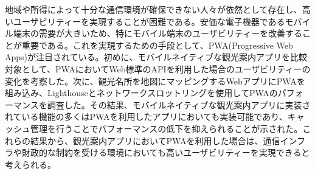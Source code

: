 地域や所得によって十分な通信環境が確保できない人々が依然として存在し、高いユーザビリティーを実現することが困難である。安価な電子機器であるモバイル端末の需要が大きいため、特にモバイル端末のユーザビリティーを改善することが重要である。これを実現するための手段として、PWA(Progressive Web Apps)が注目されている。初めに、モバイルネイティブな観光案内アプリを比較対象として、PWAにおいてWeb標準のAPIを利用した場合のユーザビリティーの変化を考察した。次に、観光名所を地図にマッピングするWebアプリにPWAを組み込み、Lighthouseとネットワークスロットリングを使用してPWAのパフォーマンスを調査した。その結果、モバイルネイティブな観光案内アプリに実装されている機能の多くはPWAを利用したアプリにおいても実装可能であり、キャッシュ管理を行うことでパフォーマンスの低下を抑えられることが示された。これらの結果から、観光案内アプリにおいてPWAを利用した場合は、通信インフラや財政的な制約を受ける環境においても高いユーザビリティーを実現できると考えられる。